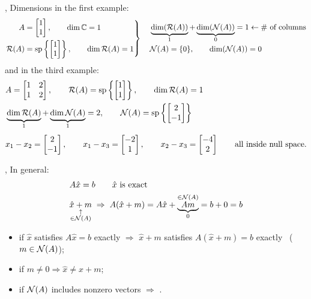 \sep
Dimensions in the first example:
\begin{gather*}
\left.\begin{aligned}
A &= \begin{bmatrix}1\\1\end{bmatrix}, \qquad \dim\mathbb{C} = 1\\
\mathcal{R}(A) &= \operatorname{sp}\left\{\begin{bmatrix}1\\1\end{bmatrix}\right\}, \qquad \dim\mathcal{R}(A) = 1
\end{aligned}\right\}
\quad
\begin{aligned}
&\underbrace{\dim(\mathcal{R}(A))}_{1} + \underbrace{\dim(\mathcal{N}(A))}_{0} = 1 \leftarrow \#\text{ of columns}\\
&\mathcal{N}(A) = \{0\}, \qquad \dim(\mathcal{N}(A)) = 0
\end{aligned}
\end{gather*}
and in the third example:
\begin{align*}
&A = \begin{bmatrix}1&2\\1&2\end{bmatrix}, \qquad \mathcal{R}(A) = \operatorname{sp}\left\{\begin{bmatrix}1\\1\end{bmatrix}\right\}, \qquad \dim\mathcal{R}(A) = 1\\
&\underbrace{\dim\mathcal{R}(A)}_{1} + \underbrace{\dim\mathcal{N}(A)}_{1} = 2, \qquad
\mathcal{N}(A) = \operatorname{sp}\left\{\begin{bmatrix}2\\-1\end{bmatrix}\right\}\\[4pt]
&x_1-x_2 = \begin{bmatrix}2\\-1\end{bmatrix}, \qquad x_1-x_3 = \begin{bmatrix}-2\\1\end{bmatrix}, \qquad x_2-x_3 = \begin{bmatrix}-4\\2\end{bmatrix} \qquad \text{all inside null space.}
\end{align*}

\sep
In general:
\begin{align*}
&A\hat x = b \qquad \hat x \text{ is exact}\\
&\underset{\substack{\uparrow\\ \in\mathcal{N}(A)}}{\hat x + m} \;\Rightarrow\; A(\hat x+m) = A\hat x + \underbrace{\overset{\in\mathcal{N}(A)}{Am}}_{0} = b+0 = b
\end{align*}
\begin{itemize}[nosep]
  \item if $\hat x$ satisfies $A\hat x = b$ exactly $\Rightarrow$ $\hat x + m$ satisfies $A(\hat x+m) = b$ exactly \ ($m\in\mathcal{N}(A)$);
  \item if $m\neq 0 \Rightarrow \hat x \neq \hat x + m$;
  \item if $\mathcal{N}(A)$ includes nonzero vectors $\Rightarrow$ .
\end{itemize}

